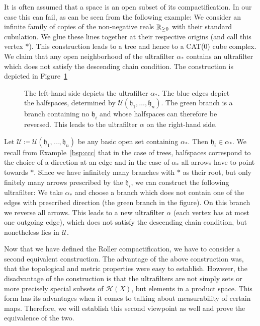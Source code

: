 \begin{rem}
  It is often assumed that a space is an open subset of its compactification. In our case this can fail, as can be seen from the following example: We consider an infinite family of copies of the non-negative reals \(\mathbb{R}_{\geq0}\) with their standard cubulation. We glue these lines together at their respective origins (and call this vertex \(\ast\)). This construction leads to a tree and hence to a CAT(0) cube complex. We claim that any open neighborhood of the ultrafilter \(\alpha_\ast\) contains an ultrafilter which does not satisfy the descending chain condition. The construction is depicted in Figure~\ref{fig:roller-counterexample}
  \begin{figure}[htbp]
    \centering
    
    \caption{The left-hand side depicts the ultrafilter \(\alpha_\ast\). The blue edges depict the halfspaces, determined by \(\mathcal{U}(\mathfrak{h}_1, \dots, \mathfrak{h}_n)\). The green branch is a branch containing no \(\mathfrak{h}_i\) and whose halfspaces can therefore be reversed. This leads to the ultrafilter \(\alpha\) on the right-hand side.}
    \label{fig:roller-counterexample}
  \end{figure}

  Let \(\mathcal{U} \coloneqq \mathcal{U}(\mathfrak{h}_1, \dots, \mathfrak{h}_n)\) be any basic open set containing \(\alpha_\ast\). Then \(\mathfrak{h}_i \in \alpha_\ast\). We recall from Example~\ref{bsp:ccc} that in the case of trees, halfspaces correspond to the choice of a direction at an edge and in the case of \(\alpha_\ast\) all arrows have to point towards \(\ast\). Since we have infinitely many branches with \(\ast\) as their root, but only finitely many arrows prescribed by the \(\mathfrak{h}_i\), we can construct the following ultrafilter: We take \(\alpha_\ast\) and choose a branch which does not contain one of the edges with prescribed direction (the green branch in the figure). On this branch we reverse all arrows. This leads to a new ultrafilter \(\alpha\) (each vertex has at most one outgoing edge), which does not satisfy the descending chain condition, but nonetheless lies in \(\mathcal{U}\).
\end{rem}

Now that we have defined the Roller compactification, we have to consider a second equivalent construction. The advantage of the above construction was, that the topological and metric properties were easy to establish. However, the disadvantage of the construction is that the ultrafilters are not simply sets or more precisely special subsets of \(\mathcal{H}(X)\), but elements in a product space. This form has its advantages when it comes to talking about measurability of certain maps. Therefore, we will establish this second viewpoint as well and prove the equivalence of the two.

